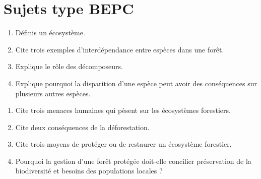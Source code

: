 \section{Sujets type BEPC}

\begin{enumerate}[label=\arabic*)]
\item Définis un écosystème.
\item Cite trois exemples d'interdépendance entre espèces dans une forêt.
\item Explique le rôle des décomposeurs.
\item Explique pourquoi la disparition d'une espèce peut avoir des conséquences sur
plusieurs autres espèces.
\end{enumerate}

\begin{enumerate}[label=\arabic*)]
\item Cite trois menaces humaines qui pèsent sur les écosystèmes forestiers.
\item Cite deux conséquences de la déforestation.
\item Cite trois moyens de protéger ou de restaurer un écosystème forestier.
\item Pourquoi la gestion d'une forêt protégée doit-elle concilier préservation de
la biodiversité et besoins des populations locales ?
\end{enumerate}

